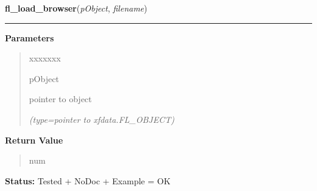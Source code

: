 \hspace{.8\funcindent}\begin{boxedminipage}{\funcwidth}

    \raggedright \textbf{fl\_load\_browser}(\textit{pObject}, \textit{filename})

    \vspace{-1.5ex}

    \rule{\textwidth}{0.5\fboxrule}
\setlength{\parskip}{2ex}
\setlength{\parskip}{1ex}
      \textbf{Parameters}
      \vspace{-1ex}

      \begin{quote}
        \begin{Ventry}{xxxxxxx}

          \item[pObject]

          pointer to object

            {\it (type=pointer to xfdata.FL\_OBJECT)}

        \end{Ventry}

      \end{quote}

      \textbf{Return Value}
    \vspace{-1ex}

      \begin{quote}
      num

      \end{quote}

\textbf{Status:} Tested + NoDoc + Example = OK



    \end{boxedminipage}

    \label{xformslib:library:fl_select_browser_line}

    \vspace{0.5ex}


